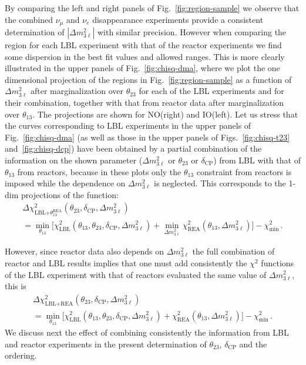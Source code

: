 \documentclass[a4paper, 11pt]{article}
\newcommand{\Dmq}{\Delta m^2}
\begin{document}
By comparing the left and right panels of Fig.~\ref{fig:region-sample}
we observe that the combined $\nu_\mu$ and $\nu_e$ disappearance
experiments provide a consistent determination of $|\Dmq_{3\ell}|$
with similar precision.  However when comparing the region for each
LBL experiment with that of the reactor experiments we find some
dispersion in the best fit values and allowed ranges.
%
This is more clearly illustrated in the upper panels of
Fig.~\ref{fig:chisq-dma}, where we plot the one dimensional projection
of the regions in Fig.~\ref{fig:region-sample} as a function of
$\Dmq_{3\ell}$ after marginalization over $\theta_{23}$ for each of
the LBL experiments and for their combination, together with that from
reactor data after marginalization over $\theta_{13}$.  The
projections are shown for NO(right) and IO(left). Let us stress that
the curves corresponding to LBL experiments in the upper panels of
Fig.~\ref{fig:chisq-dma} (as well as those in the upper panels of
Figs.~\ref{fig:chisq-t23} and~\ref{fig:chisq-dcp}) have been obtained
by a partial combination of the information on the shown parameter
($\Dmq_{3\ell}$ or $\theta_{23}$ or $\delta_\text{CP}$) from LBL with
that of $\theta_{13}$ from reactors, because in these plots only the
$\theta_{13}$ constraint from reactors is imposed while the dependence
on $\Dmq_{3\ell}$ is neglected. This corresponds to the 1-dim
projections of the function:
%
\begin{multline}
  \Delta\chi^2_\text{LBL+$\theta_{13}^\text{REA}$}
  (\theta_{23}, \delta_\text{CP}, \Dmq_{3\ell})
  \\
  = \min_{\theta_{13}} \Big[
    \chi^2_\text{LBL}(\theta_{13}, \theta_{23}, \delta_\text{CP}, \Dmq_{3\ell})
    + \min_{\Dmq_{3\ell}}\chi^2_\text{REA}(\theta_{13}, \Dmq_{3\ell}) \Big]
  - \chi^2_\text{min} \,.
  \label{eq:lblt13r}
\end{multline}

However, since reactor data also depends on $\Dmq_{3\ell}$ the full
combination of reactor and LBL results implies that one must add
consistently the $\chi^2$ functions of the LBL experiment with that of
reactors evaluated the same value of $\Dmq_{3\ell}$, this is
%
\begin{multline}
  \Delta\chi^2_\text{LBL+REA}
  (\theta_{23}, \delta_\text{CP}, \Dmq_{3\ell})
  \\
  = \min_{\theta_{13}} \Big[
    \chi^2_\text{LBL}(\theta_{13}, \theta_{23}, \delta_\text{CP}, \Dmq_{3\ell})
    + \chi^2_\text{REA}(\theta_{13}, \Dmq_{3\ell}) \Big]
  - \chi^2_\text{min} \,.
  \label{eq:lblreac}
\end{multline}
%
We discuss next the effect of combining consistently the information
from LBL and reactor experiments in the present determination of
$\theta_{23}$, $\delta_\text{CP}$ and the ordering.
\end{document}

